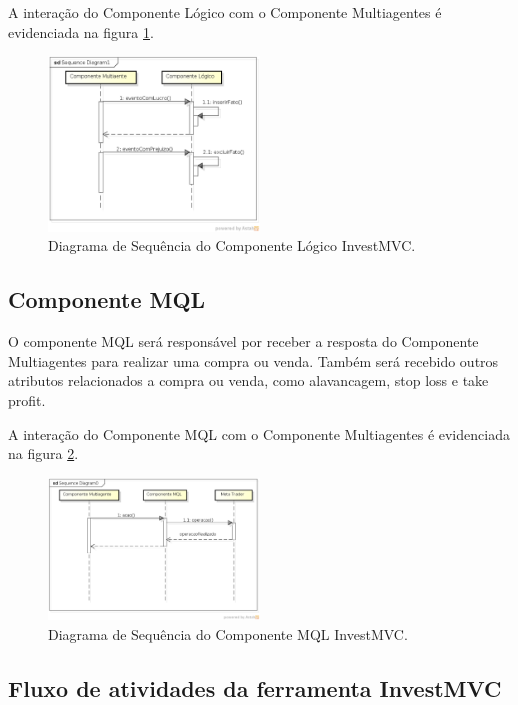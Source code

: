 A interação do Componente Lógico com o Componente Multiagentes é evidenciada na figura \ref{sequenciaLogico}.

\begin{figure}[htp]
\centering
\includegraphics[width=0.5\textwidth]{figuras/sequenciaLogico}
\caption{Diagrama de Sequência do Componente Lógico InvestMVC.}
\label{sequenciaLogico}
\end{figure}

\subsection{Componente MQL}

O componente MQL será responsável por receber a resposta do Componente Multiagentes para realizar uma compra ou venda. Também será recebido outros atributos relacionados a compra ou venda, como alavancagem, stop loss e take profit.

A interação do Componente MQL com o Componente Multiagentes é evidenciada na figura \ref{sequenciaMQL}.

\begin{figure}[htp]
\centering
\includegraphics[width=0.5\textwidth]{figuras/sequenciaMQL}
\caption{Diagrama de Sequência do Componente MQL InvestMVC.}
\label{sequenciaMQL}
\end{figure}

\subsection{Fluxo de atividades  da ferramenta InvestMVC}

